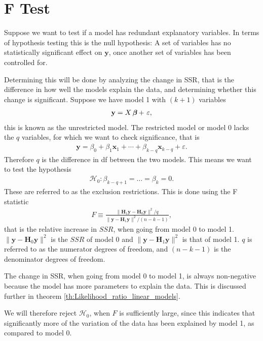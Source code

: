 \section{F Test}
Suppose we want to test if a model has redundant explanatory variables.
In terms of hypothesis testing this is the null hypothesis: A set of variables has no statistically significant effect on $\textbf{y}$, once another set of variables has been controlled for.

Determining this will be done by analyzing the change in SSR, that is the difference in how well the models explain the data, and determining whether this change is significant. 
Suppose we have model 1 with $(k+1)$ variables 
\begin{align*}
    \textbf{y} = X \operatorname{\boldsymbol{\beta}} +\  \varepsilon,
\end{align*}
this is known as the unrestricted model. The restricted model or model 0 lacks the $q$ variables, for which we want to check significance, that is
\begin{align*}
    \textbf{y} = \beta_0 + \beta_1 \textbf{x}_1 + \cdots + \beta_{k-q} \textbf{x}_{k-q} + \varepsilon.
\end{align*}
Therefore $q$ is the difference in df between the two models.
This means we want to test the hypothesis
\begin{align}
    \mathcal{H}_0: \beta_{k-q+1} = \ldots = \beta_k = 0.
\end{align}
These are referred to as the exclusion restrictions. 
This is done using the F statistic
\begin{align}\label{eq:F_statistic}
    F \equiv \frac{\| \textbf{H}_1 \textbf{y} - \textbf{H}_0 \textbf{y} \|^2/q}{\| \textbf{y} - \textbf{H}_1 \textbf{y} \|^2/(n-k-1)},
\end{align}
that is the relative increase in $SSR$, when going from model 0 to model 1. 
$\| \textbf{y} - \textbf{H}_0 \textbf{y} \|^2$ is the $SSR$ of model 0 and $\| \textbf{y} - \textbf{H}_1 \textbf{y} \|^2$ is that of model 1. 
$q$ is referred to as the numerator degrees of freedom, and $(n-k-1)$ is the denominator degrees of freedom. 

The change in SSR, when going from model 0 to model 1, is always non-negative because the model has more parameters to explain the data. 
This is discussed further in theorem \ref{th:Likelihood_ratio_linear_models}.

We will therefore reject $\mathcal{H}_0$, when $F$ is sufficiently large, since this indicates that significantly more of the variation of the data has been explained by model 1, as compared to model 0.

